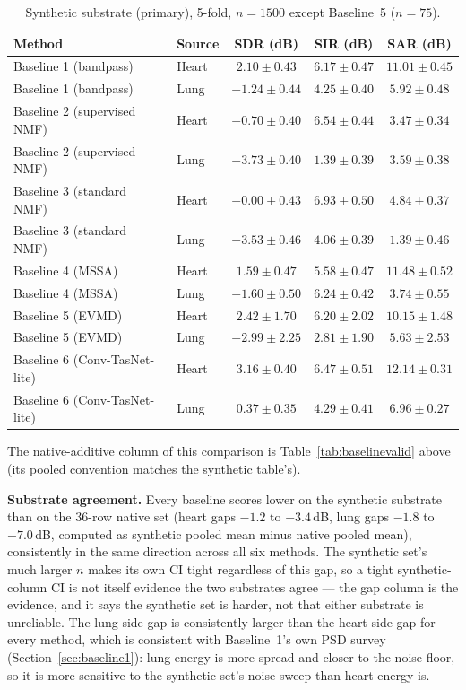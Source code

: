 \documentclass[11pt]{article}
\begin{document}
\begin{table}[H]
\centering
\caption{Synthetic substrate (primary), 5-fold, $n{=}1500$ except Baseline~5 ($n{=}75$).}
\label{tab:sixmethodsynth}
\begin{tabular}{@{}llccc@{}}
\toprule
Method & Source & SDR (dB) & SIR (dB) & SAR (dB) \\
\midrule
Baseline 1 (bandpass) & Heart & $2.10 \pm 0.43$ & $6.17 \pm 0.47$ & $11.01 \pm 0.45$ \\
Baseline 1 (bandpass) & Lung  & $-1.24 \pm 0.44$ & $4.25 \pm 0.40$ & $5.92 \pm 0.48$ \\
\addlinespace
Baseline 2 (supervised NMF) & Heart & $-0.70 \pm 0.40$ & $6.54 \pm 0.44$ & $3.47 \pm 0.34$ \\
Baseline 2 (supervised NMF) & Lung  & $-3.73 \pm 0.40$ & $1.39 \pm 0.39$ & $3.59 \pm 0.38$ \\
\addlinespace
Baseline 3 (standard NMF) & Heart & $-0.00 \pm 0.43$ & $6.93 \pm 0.50$ & $4.84 \pm 0.37$ \\
Baseline 3 (standard NMF) & Lung  & $-3.53 \pm 0.46$ & $4.06 \pm 0.39$ & $1.39 \pm 0.46$ \\
\addlinespace
Baseline 4 (MSSA) & Heart & $1.59 \pm 0.47$ & $5.58 \pm 0.47$ & $11.48 \pm 0.52$ \\
Baseline 4 (MSSA) & Lung  & $-1.60 \pm 0.50$ & $6.24 \pm 0.42$ & $3.74 \pm 0.55$ \\
\addlinespace
Baseline 5 (EVMD) & Heart & $2.42 \pm 1.70$ & $6.20 \pm 2.02$ & $10.15 \pm 1.48$ \\
Baseline 5 (EVMD) & Lung  & $-2.99 \pm 2.25$ & $2.81 \pm 1.90$ & $5.63 \pm 2.53$ \\
\addlinespace
Baseline 6 (Conv-TasNet-lite) & Heart & $3.16 \pm 0.40$ & $6.47 \pm 0.51$ & $12.14 \pm 0.31$ \\
Baseline 6 (Conv-TasNet-lite) & Lung  & $0.37 \pm 0.35$ & $4.29 \pm 0.41$ & $6.96 \pm 0.27$ \\
\bottomrule
\end{tabular}
\end{table}

The native-additive column of this comparison is Table~\ref{tab:baselinevalid}
above (its pooled convention matches the synthetic table's).

\textbf{Substrate agreement.} Every baseline scores lower on the synthetic
substrate than on the 36-row native set (heart gaps $-1.2$ to $-3.4$\,dB,
lung gaps $-1.8$ to $-7.0$\,dB, computed as synthetic pooled mean minus native pooled
mean), consistently in the same direction across all six methods. The
synthetic set's much larger $n$ makes its own CI tight regardless of this
gap, so a tight synthetic-column CI is not itself evidence the two
substrates agree --- the gap column is the evidence, and it says the
synthetic set is harder, not that either substrate is unreliable. The
lung-side gap is consistently larger than the heart-side gap for every
method, which is consistent with Baseline~1's own PSD survey
(Section~\ref{sec:baseline1}): lung energy is more spread and closer to the
noise floor, so it is more sensitive to the synthetic set's noise sweep
than heart energy is.
\end{document}
